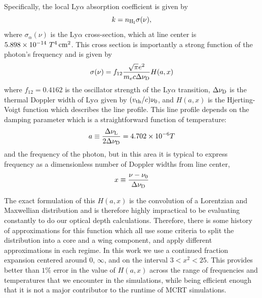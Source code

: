 Specifically, the local Ly$\alpha$ absorption coefficient is given by
\begin{equation}
   \label{eq:kalpaha}
   k = n_{\rm H _I} \sigma(\nu),
\end{equation}
where $\sigma_\alpha(\nu)$ is the Ly$\alpha$ cross-section, which at line center is $5.898\times 10 ^{-14}\ T ^4\,\rm cm^2$.
This cross section is importantly a strong function of the photon's frequency and is given by
\begin{equation}
    \sigma(\nu) = f_{12}\frac{\sqrt{\pi} e^{2}}{m_{e} c \Delta\nu_{\rm{D}}} H(a, x)
\end{equation}
where $f_{12} = 0.4162$ is the oscillator strength of the Ly$\alpha$ transition, $\Delta\nu_{\rm{D}}$ is the thermal Doppler width of Ly$\alpha$ given by $(v_{\rm{th}}/c)\nu_{0}$, and $H(a, x)$ is the Hjerting-Voigt function which describes the line profile.
This line profile depends on the damping parameter which is a straightforward function of temperature:
\begin{equation}
    a \equiv \frac{\Delta \nu_{\rm{L}}}{2\Delta \nu_{\rm{D}}} = 4.702 \times 10^{-6} T
\end{equation}
and the frequency of the photon, but in this area it is typical to express frequency as a dimensionless number of Doppler widths from line center,
\begin{equation}
    x \equiv \frac{\nu - \nu_{0}}{\Delta\nu_{\rm{D}}}
\end{equation}

The exact formulation of this $H(a, x)$ is the convolution of a Lorentzian and Maxwellian distribution and is therefore highly impractical to be evaluating constantly to do our optical depth calculations.
Therefore, there is some history of approximations for this function which all use some criteria to split the distribution into a core and a wing component, and apply different approximations in each regime.
In this work we use a continued fraction expansion centered around $0$, $\infty$, and on the interval $3 < x^{2} < 25$.
This provides better than $1\%$ error in the value of $H(a, x)$ across the range of frequencies and temperatures that we encounter in the simulations, while being efficient enough that it is not a major contributor to the runtime of MCRT simulations.

